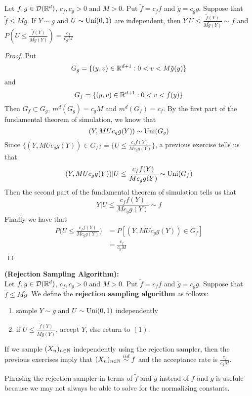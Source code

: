\documentclass{book}
\begin{document}
	\begin{ex}
		Let $f, g \in \mathcal{D}(\mathbb{R}^d)$, $c_f,c_g>0$ and $M > 0$. Put $\tilde{f} = c_f f$ and $\tilde{g} = c_g g$. Suppose that $\tilde{f} \leq M \tilde{g}$. If $Y \sim g$ and $U \sim \operatorname{Uni}(0,1)$ are independent, then $Y|U \leq \frac{\tilde{f}(Y)}{M\tilde{g}(Y)} \sim f$ and $P ( U \leq \frac{\tilde{f}(Y)}{M\tilde{g}(Y)} ) = \frac{c_f}{c_gM}$ 
	\end{ex}

	\begin{proof}
		Put $$G_g = \{(y,v) \in \mathbb{R}^{d+1}: 0< v < M\tilde{g}(y)\} $$ and $$ G_f = \{(y,v) \in \mathbb{R}^{d+1}: 0< v < \tilde{f}(y)\} $$ 
		Then $G_f \subset G_g$, $m^d(G_g) = c_gM$ and $m^d(G_f) =c_f$. By the first part of the fundamental theorem of simulation, we know that $$(Y, MUc_gg(Y)) \sim \operatorname{Uni}(G_g)$$ 
		Since $\{(Y, MUc_gg(Y)) \in G_f \} = \{U \leq \frac{c_ff(Y)}{Mc_gg(Y)}\}$, a previous exercise tells us that $$(Y, MUc_gg(Y))|U \leq \frac{c_ff(Y)}{Mc_gg(Y)} \sim \operatorname{Uni}(G_f)$$
		Then the second part of the fundamental theorem of simulation tells us that $$Y|U \leq \frac{c_ff(Y)}{Mc_gg(Y)} \sim f$$
		Finally we have that
		\begin{align*}
			P \bigg( U \leq \frac{c_ff(Y)}{Mc_gg(Y)} \bigg) 
			&= P [(Y, MUc_gg(Y)) \in G_f ]\\
			&= \frac{c_f}{c_gM}
		\end{align*}
	\end{proof}

	\begin{defn}\textbf{(Rejection Sampling Algorithm):} \\
		Let $f, g \in \mathcal{D}(\mathbb{R}^d)$, $c_f,c_g>0$ and $M > 0$. Put $\tilde{f} = c_f f$ and $\tilde{g} = c_g g$. Suppose that $\tilde{f} \leq M \tilde{g}$. We define the \textbf{rejection sampling algorithm} as follows:
		\begin{enumerate}
			\item sample $Y \sim g$ and $U \sim \operatorname{Uni}(0,1)$ independently
			\item if $U \leq \frac{\tilde{f}(Y)}{M\tilde{g}(Y)} $, accept $Y$, else return to $(1)$.
		\end{enumerate}
		If we sample $(X_n)_{n \in \mathbb{N}}$ independently using the rejection sampler, then the previous exercises imply that $(X_n)_{n \in \mathbb{N}} \stackrel{iid}{\sim} f$ and the acceptance rate is $\frac{c_f}{c_gM}$.
	\end{defn}

	\begin{note}
		Phrasing the rejection sampler in terms of $\tilde{f}$ and $\tilde{g}$ instead of $f$ and $g$ is usefule because we may not always be able to solve for the normalizing constants.
	\end{note}
	
\end{document}
